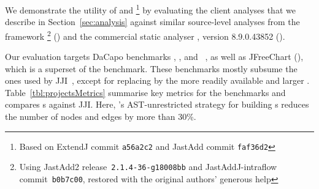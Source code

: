 We demonstrate the utility of {\intracfg} and {\intraj}\footnote{Based on ExtendJ commit \texttt{a56a2c2} and JastAdd commit \texttt{faf36d2}} by evaluating the client analyses that we describe in Section~\ref{sec:analysis} against similar source-level analyses
from the {\ParentFirst} framework {\jastaddjintraflow}\footnote{
  Using JastAdd2 release~\texttt{2.1.4-36-g18008bb} and JastAddJ-intraflow commit~\texttt{b0b7c00}, restored with the original authors' generous help
} () and the commercial static analyser , version 8.9.0.43852 ().

Our evaluation targets DaCapo benchmarks , , and ~\cite{DaCapo:paper}, as well as
JFreeChart (), which is a superset of the  benchmark.
These benchmarks mostly subsume the ones used by JJI~\cite{10.1016/j.scico.2012.02.002},
except for replacing   by the more readily available and larger .
%
Table~\ref{tbl:projectsMetrics} summarise key metrics for the benchmarks and compares {\CFG}s against JJI.
Here, {\intraj}'s AST-unrestricted strategy for building {\CFG}s
reduces the number of nodes and edges by more than 30\%.



